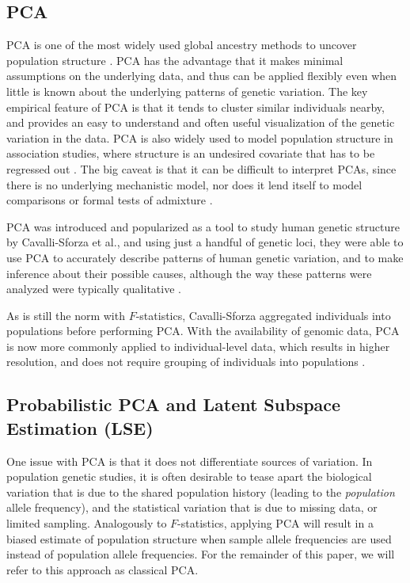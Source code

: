 \documentclass[12pt]{article}
\begin{document}
\subsection{PCA}
PCA is one of the most widely used global ancestry methods to uncover population structure \citep{cavalli-sforza_analysis_1975, mcvean_genealogical_2009, engelhardt_analysis_2010}. PCA has the advantage that it makes minimal assumptions on the underlying data, and thus can be applied flexibly even when little is known about the underlying patterns of genetic variation. The key empirical feature of PCA is that it tends to cluster similar individuals nearby, and provides an easy to understand and often useful visualization of the genetic variation in the data. PCA is also widely used to model population structure in association studies, where structure is an undesired covariate that has to be regressed out \citep{price_principal_2006}. The big caveat is that it can be difficult to interpret PCAs, since there is no underlying mechanistic model, nor does it lend itself to model comparisons or formal tests of admixture \citep{mcvean_genealogical_2009, novembre_interpreting_2008}.


PCA was introduced and popularized as a tool to study human genetic structure by Cavalli-Sforza et al., and using just a handful of genetic loci, they were able to use PCA to accurately describe patterns of human genetic variation, and to make inference about their possible causes, although the way these patterns were analyzed were typically qualitative \citep{menozzi_synthetic_1978, sforza_great_1995, l_l_cavalli-sforza_history_1996}.

As is still the norm with $F$-statistics, Cavalli-Sforza aggregated individuals into populations before performing PCA. With the availability of genomic data, PCA is now more commonly applied to individual-level data, which results in higher resolution, and does not require grouping of individuals into populations \citep{patterson_population_2006, novembre_genes_2008, price_principal_2006}.


\subsection{Probabilistic PCA and Latent Subspace Estimation (LSE)}
One issue with PCA is that it does not differentiate sources of variation. In population genetic studies, it is often desirable to tease apart the biological variation that is due to the shared population history (leading to the \textit{population} allele frequency), and the statistical variation that is due to missing data, or limited sampling. Analogously to $F$-statistics, applying PCA will result in a biased estimate of population structure when sample allele frequencies are used instead of population allele frequencies. For the remainder of this paper, we will refer to this approach as classical PCA.
\end{document}
